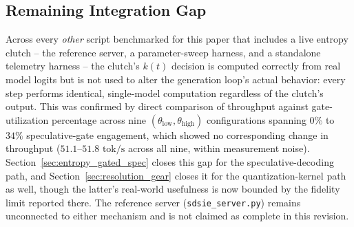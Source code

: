 \documentclass[10pt,journal,compsoc,twocolumn]{IEEEtran}
\begin{document}
\subsection{Remaining Integration Gap}
\label{sec:integration_gap}
Across every \textit{other} script benchmarked for this paper that includes a live entropy clutch -- the reference server, a parameter-sweep harness, and a standalone telemetry harness -- the clutch's $k(t)$ decision is computed correctly from real model logits but is not used to alter the generation loop's actual behavior: every step performs identical, single-model computation regardless of the clutch's output. This was confirmed by direct comparison of throughput against gate-utilization percentage across nine $(\theta_{\text{low}}, \theta_{\text{high}})$ configurations spanning $0\%$ to $34\%$ speculative-gate engagement, which showed no corresponding change in throughput ($51.1$--$51.8\text{ tok/s}$ across all nine, within measurement noise). Section~\ref{sec:entropy_gated_spec} closes this gap for the speculative-decoding path, and Section~\ref{sec:resolution_gear} closes it for the quantization-kernel path as well, though the latter's real-world usefulness is now bounded by the fidelity limit reported there. The reference server (\texttt{sdsie\_server.py}) remains unconnected to either mechanism and is not claimed as complete in this revision.

\end{document}
